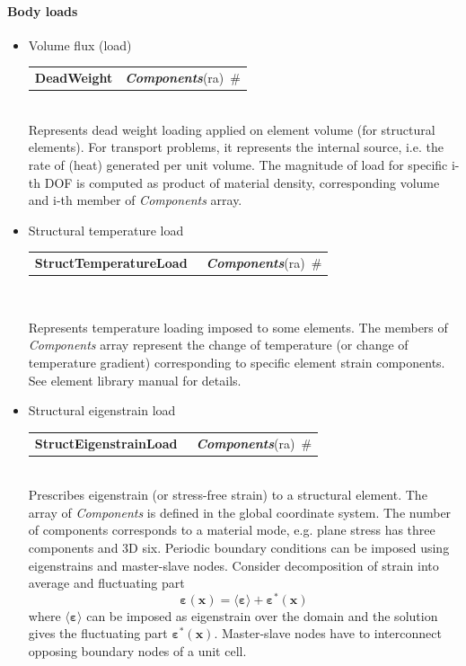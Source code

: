 \documentclass[a4paper]{article}
\makeatletter
\newcommand{\vect}[1]{\mathbf{#1}} %
\newcommand{\tens}[1]{\pmb{#1}} %
\newcommand{\strain}{\varepsilon}
\newcommand{\param}[1]{{\em #1}}
\newcommand{\keywordnotype}[1]{\mbox{{\it{\bf{#1}}}}}
\newcommand{\keyword}[2]{\mbox{{\keywordnotype{#1}\tiny (#2)}}}
\newcommand{\entKeywordInst}[1]{\mbox{{\bf{{#1}}}}}
\newcommand{\field}[2]{\mbox{\keyword{#1}{#2}~\#}}
\newenvironment{record}[1][]{\begin{tabular}{|ll}}{\end{tabular}\\}
\newcommand{\recentry}[2]{{#1}&{#2}\\}
\newcounter{rcc}
\newenvironment{record}[1][\textwidth]{\setcounter{rcc}{0}\begin{tabular*}{#1}{|ll@{\extracolsep{\fill}}r}}{\end{tabular*}\\}
\newcommand{\recentry}[2]{\ifthenelse{\value{rcc}>0}{&$\backslash$ \\}{\setcounter{rcc}{1}}{#1}&{#2}}
\makeatother
\begin{document}
\paragraph{Body loads}
\begin{itemize}
\item Volume flux (load)

\noindent
\begin{record}[0.9\textwidth]
  \recentry{\entKeywordInst{DeadWeight}}{\field{Components}{ra}}
\end{record}
Represents dead weight loading applied on element volume (for
structural elements). For transport problems, it represents the
internal source, i.e. the rate of (heat) generated per unit volume.
The magnitude of load for specific i-th DOF is computed as product of material density,
corresponding volume and i-th member of \param{Components} array.
\item Structural temperature load

\noindent
\begin{record}[0.9\textwidth]
  \recentry{\entKeywordInst{StructTemperatureLoad}~}{\field{Components}{ra}}
\end{record}

Represents temperature loading imposed to some elements. The members of
\param{Components} array represent the change of temperature (or change
of temperature gradient) corresponding to
specific element strain components. See element library manual for details.

\item Structural eigenstrain load

\noindent
\begin{record}[0.9\textwidth]
  \recentry{\entKeywordInst{StructEigenstrainLoad}~}{\field{Components}{ra}}
\end{record}
Prescribes eigenstrain (or stress-free strain) to a structural element. The array of \param{Components} is defined in the global coordinate system. The number of components corresponds to a material mode, e.g. plane stress has three components and 3D six. Periodic boundary conditions can be imposed using eigenstrains and master-slave nodes. Consider decomposition of strain into average and fluctuating part
\begin{equation}
\tens{\strain}(\vect{x}) = \langle \tens{\strain} \rangle + \tens{\strain}^*(\vect{x})
\end{equation}
where $\langle \tens{\strain} \rangle$ can be imposed as eigenstrain over the domain and the solution gives the fluctuating part $\tens{\strain}^*(\vect{x})$. Master-slave nodes have to interconnect opposing boundary nodes of a unit cell.


\end{itemize}
\end{document}
